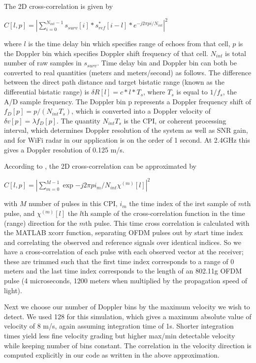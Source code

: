 \documentclass[article,11pt,onecolumn,final]{IEEEtran}
\begin{document}
The 2D cross-correlation is given by

$ C[l, p] = | \sum\limits_{i=0}^{N_{int}-1} s_{surv}[i]*s_{ref}^{*}[i - l]*e^{-j2\pi pi/N_{int}}|^2 $

where $l$ is the time delay bin which specifies range of echoes from that cell, $p$ is the Doppler bin which specifies Doppler shift frequency of that cell. $N_{int}$ is total number of raw samples in $s_{surv}$. Time delay bin and Doppler bin can both be converted to real quantities (meters and meters/second) as follows. The difference between the direct path distance and target bistatic range (known as the differential bistatic range) is $\delta R[l] = c*l*T_s$, where $T_s$ is equal to $1/f_s$, the A/D sample frequency. The Doppler bin p represents a Doppler frequency shift of $f_D[p] = p/(N_{int}T_s)$, which is converted into a Doppler velocity of $\delta v[p] = \lambda f_D[p]$. The quantity $N_{int}T_s$ is the CPI, or coherent processing interval, which determines Doppler resolution of the system as well as SNR gain, and for WiFi radar in our application is on the order of 1 second. At 2.4GHz this gives a Doppler resolution of 0.125 m/s.

According to \cite{Colone2012}, the 2D cross-correlation can be approximated by

$ C[l, p] = |\sum\limits_{m=0}^{M-1}\exp{-j2\pi pi_m/N_{int}}\chi^{(m)}[l]|^2 $

with $M$ number of pulses in this CPI, $i_m$ the time index of the irst sample of $m$th pulse, and $\chi^{(m)}[l]$ the $l$th sample of the cross-correlation function in the time (range) direction for the $m$th pulse. This time cross correlation is calculated with the MATLAB xcorr function, separating OFDM pulses out by start time index and correlating the observed and reference signals over identical indices. So we have a cross-correlation of each pulse with each observed vector at the receiver; these are trimmed such that the first time index corresponds to a range of 0 meters and the last time index corresponds to the length of an 802.11g OFDM pulse (4 microseconds, 1200 meters when multiplied by the propagation speed of light).

Next we choose our number of Doppler bins by the maximum velocity we wish to detect. We used 128 for this simulation, which gives a maximum absolute value of velocity of 8 m/s, again assuming integration time of 1s. Shorter integration times yield less fine velocity grading but higher max/min detectable velocity while keeping number of bins constant. The correlation in the velocity direction is computed explicitly in our code as written in the above approximation.
\end{document}
